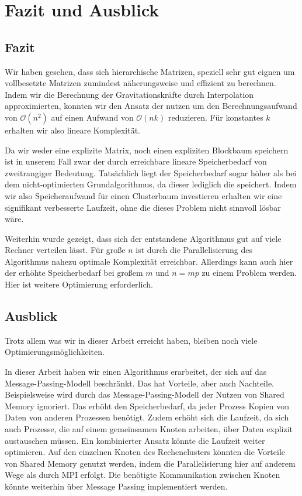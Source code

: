 \chapter{Fazit und Ausblick}
\label{chp:Conclusions}
  \section{Fazit}
    Wir haben gesehen, dass sich hierarchische Matrizen, speziell \hquad sehr gut eignen um vollbesetzte Matrizen zumindest näherungsweise und effizient zu berechnen.
    Indem wir die Berechnung der Gravitationskräfte durch Interpolation approximierten, konnten wir den Ansatz der \hquad nutzen um den Berechnungsaufwand von $\mathcal{O}(n^2)$ auf einen
    Aufwand von $\mathcal{O}(nk)$ reduzieren. Für konstantes $k$ erhalten wir also lineare Komplexität.
    
    Da wir weder eine explizite Matrix, noch einen expliziten Blockbaum speichern ist in unserem Fall zwar der durch \hquad erreichbare lineare Speicherbedarf
    von zweitrangiger Bedeutung. Tatsächlich liegt der Speicherbedarf sogar höher als bei dem nicht-optimierten Grundalgorithmus, da dieser lediglich die  speichert. Indem wir
    also Speicheraufwand für einen Clusterbaum investieren erhalten wir eine signifikant verbesserte Laufzeit, ohne die dieses Problem nicht sinnvoll lösbar wäre.
    
    Weiterhin wurde gezeigt, dass sich der entstandene Algorithmus gut auf viele Rechner verteilen lässt. Für große $n$ ist durch die Parallelisierung des Algorithmus nahezu optimale Komplexität 
    erreichbar. Allerdings kann auch hier der erhöhte Speicherbedarf bei großem $m$ und $n=mp$ zu einem Problem werden. Hier ist weitere Optimierung erforderlich.
    
  \section{Ausblick}
  \label{sec:ausblick}
    Trotz allem was wir in dieser Arbeit erreicht haben, bleiben noch viele Optimierungsmöglichkeiten. 
    
    In dieser Arbeit haben wir einen Algorithmus erarbeitet, der sich auf das Message-Passing-Modell beschränkt. Das hat Vorteile,
    aber auch Nachteile. Beispielsweise wird durch das Message-Passing-Modell der Nutzen von Shared Memory ignoriert. Das erhöht den Speicherbedarf, da jeder Prozess Kopien von Daten von anderen
    Prozessen benötigt. Zudem erhöht sich die Laufzeit, da sich auch Prozesse, die auf einem gemeinsamen Knoten arbeiten, über Daten explizit austauschen müssen. Ein kombinierter Ansatz könnte
    die Laufzeit weiter optimieren. Auf den einzelnen Knoten des Rechenclusters könnten die Vorteile von Shared Memory genutzt werden, indem die Parallelisierung hier auf anderem Wege als durch 
    MPI erfolgt. Die benötigte Kommunikation zwischen Knoten könnte weiterhin über Message Passing implementiert werden.
    
